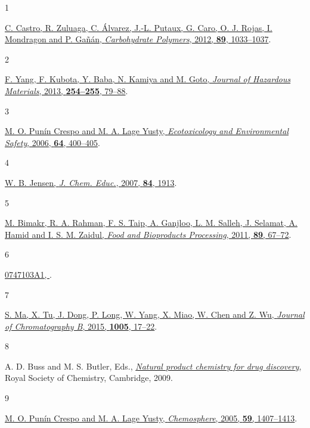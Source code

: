 \documentclass[
  twocolumn,
  landscape]{report}
\newlength{\cslhangindent}
\newlength{\csllabelwidth}
\newenvironment{CSLReferences}[2] %
 {\begin{list}{}{%
  \setlength{\itemindent}{0pt}
  \setlength{\leftmargin}{0pt}
  \setlength{\parsep}{0pt}
  \ifodd #1
   \setlength{\leftmargin}{\cslhangindent}
   \setlength{\itemindent}{-1\cslhangindent}
  \fi
  \setlength{\itemsep}{#2\baselineskip}}}
 {\end{list}}
\newcommand{\CSLLeftMargin}[1]{\parbox[t]{\csllabelwidth}{\strut#1\strut}}
\newcommand{\CSLRightInline}[1]{\parbox[t]{\linewidth - \csllabelwidth}{\strut#1\strut}}
\begin{document}
\label{refs}
\begin{CSLReferences}{0}{0}
\CSLLeftMargin{1 }%
\CSLRightInline{\href{https://doi.org/10.1016/j.carbpol.2012.03.045}{C.
Castro, R. Zuluaga, C. Álvarez, J.-L. Putaux, G. Caro, O. J. Rojas, I.
Mondragon and P. Gañán, \emph{Carbohydrate Polymers}, 2012, \textbf{89},
1033--1037}.}

\CSLLeftMargin{2 }%
\CSLRightInline{\href{https://doi.org/10.1016/j.jhazmat.2013.03.026}{F.
Yang, F. Kubota, Y. Baba, N. Kamiya and M. Goto, \emph{Journal of
Hazardous Materials}, 2013, \textbf{254--255}, 79--88}.}

\CSLLeftMargin{3 }%
\CSLRightInline{\href{https://doi.org/10.1016/j.ecoenv.2005.04.010}{M.
O. Punín Crespo and M. A. Lage Yusty, \emph{Ecotoxicology and
Environmental Safety}, 2006, \textbf{64}, 400--405}.}

\CSLLeftMargin{4 }%
\CSLRightInline{\href{https://doi.org/10.1021/ed084p1913}{W. B. Jensen,
\emph{J. Chem. Educ.}, 2007, \textbf{84}, 1913}.}

\CSLLeftMargin{5 }%
\CSLRightInline{\href{https://doi.org/10.1016/j.fbp.2010.03.002}{M.
Bimakr, R. A. Rahman, F. S. Taip, A. Ganjloo, L. M. Salleh, J. Selamat,
A. Hamid and I. S. M. Zaidul, \emph{Food and Bioproducts Processing},
2011, \textbf{89}, 67--72}.}

\CSLLeftMargin{6 }%
\CSLRightInline{\href{https://patents.google.com/patent/EP0747103A1/en}{0747103A1,
}.}

\CSLLeftMargin{7 }%
\CSLRightInline{\href{https://doi.org/10.1016/j.jchromb.2015.09.038}{S.
Ma, X. Tu, J. Dong, P. Long, W. Yang, X. Miao, W. Chen and Z. Wu,
\emph{Journal of Chromatography B}, 2015, \textbf{1005}, 17--22}.}

\CSLLeftMargin{8 }%
\CSLRightInline{A. D. Buss and M. S. Butler, Eds.,
\emph{\href{https://doi.org/10.1039/9781847559890}{Natural product
chemistry for drug discovery}}, Royal Society of Chemistry, Cambridge,
2009.}

\CSLLeftMargin{9 }%
\CSLRightInline{\href{https://doi.org/10.1016/j.chemosphere.2004.12.025}{M.
O. Punín Crespo and M. A. Lage Yusty, \emph{Chemosphere}, 2005,
\textbf{59}, 1407--1413}.}


\end{CSLReferences}
\end{document}
